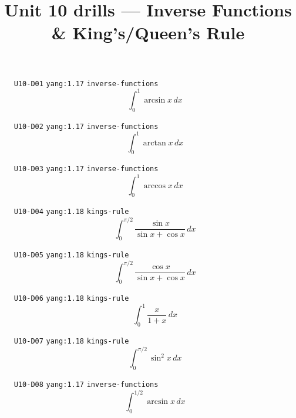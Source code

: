 
\title{Unit 10 drills --- Inverse Functions \& King's/Queen's Rule}

\maketitle
\begin{enumerate}
\item[\texttt{U10-D01}] \texttt{yang:1.17} \texttt{inverse-functions}
\[ \int_0^1\arcsin x\,dx \]
\item[\texttt{U10-D02}] \texttt{yang:1.17} \texttt{inverse-functions}
\[ \int_0^1\arctan x\,dx \]
\item[\texttt{U10-D03}] \texttt{yang:1.17} \texttt{inverse-functions}
\[ \int_0^1\arccos x\,dx \]
\item[\texttt{U10-D04}] \texttt{yang:1.18} \texttt{kings-rule}
\[ \int_0^{\pi/2}\frac{\sin x}{\sin x+\cos x}\,dx \]
\item[\texttt{U10-D05}] \texttt{yang:1.18} \texttt{kings-rule}
\[ \int_0^{\pi/2}\frac{\cos x}{\sin x+\cos x}\,dx \]
\item[\texttt{U10-D06}] \texttt{yang:1.18} \texttt{kings-rule}
\[ \int_0^1\frac{x}{1+x}\,dx \]
\item[\texttt{U10-D07}] \texttt{yang:1.18} \texttt{kings-rule}
\[ \int_0^{\pi/2}\sin^2 x\,dx \]
\item[\texttt{U10-D08}] \texttt{yang:1.17} \texttt{inverse-functions}
\[ \int_0^{1/2}\arcsin x\,dx \]
\end{enumerate}


